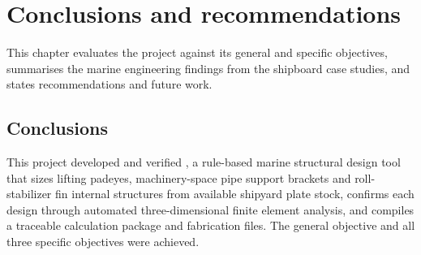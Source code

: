 \chapter{Conclusions and recommendations}
\label{chap:conclusion}

This chapter evaluates the project against its general and specific objectives,
summarises the marine engineering findings from the shipboard case studies, and
states recommendations and future work.

\section{Conclusions}
\label{sec:conclusions}

This project developed and verified \NEMO{}, a rule-based marine structural
design tool that sizes lifting padeyes, machinery-space pipe support brackets
and roll-stabilizer fin internal structures from available shipyard plate
stock, confirms each design through automated three-dimensional finite element
analysis, and compiles a traceable calculation package and fabrication files.
The general objective and all three specific objectives were achieved.

